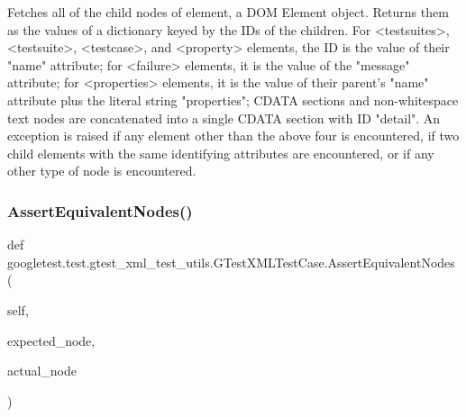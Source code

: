 \begin{DoxyVerb}Fetches all of the child nodes of element, a DOM Element object.
Returns them as the values of a dictionary keyed by the IDs of the
children.  For <testsuites>, <testsuite>, <testcase>, and <property>
elements, the ID is the value of their "name" attribute; for <failure>
elements, it is the value of the "message" attribute; for <properties>
elements, it is the value of their parent's "name" attribute plus the
literal string "properties"; CDATA sections and non-whitespace
text nodes are concatenated into a single CDATA section with ID
"detail".  An exception is raised if any element other than the above
four is encountered, if two child elements with the same identifying
attributes are encountered, or if any other type of node is encountered.
\end{DoxyVerb}
 \mbox{\label{classgoogletest_1_1test_1_1gtest__xml__test__utils_1_1_g_test_x_m_l_test_case_a053fcff673804c118cdceb4e44af290a}} 
\subsubsection{\texorpdfstring{AssertEquivalentNodes()}{AssertEquivalentNodes()}}
{\footnotesize\ttfamily def googletest.\+test.\+gtest\+\_\+xml\+\_\+test\+\_\+utils.\+G\+Test\+X\+M\+L\+Test\+Case.\+Assert\+Equivalent\+Nodes (\begin{DoxyParamCaption}\item[{}]{self,  }\item[{}]{expected\+\_\+node,  }\item[{}]{actual\+\_\+node }\end{DoxyParamCaption})}


